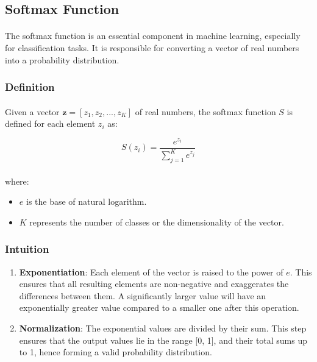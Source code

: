     \subsection{Softmax Function}\label{seq:background:softmax_function}

        \paragraph{}The softmax function is an essential component in machine learning, especially for classification tasks. It is responsible for converting a vector of real numbers into a probability distribution.

        \subsubsection{Definition}

            \paragraph{}Given a vector \( \mathbf{z} = [z_1, z_2, ..., z_K] \) of real numbers, the softmax function \( S \) is defined for each element \( z_i \) as:

            \begin{equation}
            S(z_i) = \frac{e^{z_i}}{\sum_{j=1}^{K} e^{z_j}}
            \end{equation}

            \paragraph{}where:
            \begin{itemize}
                \item \( e \) is the base of natural logarithm.
                \item \( K \) represents the number of classes or the dimensionality of the vector.
            \end{itemize}

        \subsubsection{Intuition}

            \begin{enumerate}
                \item \textbf{Exponentiation}: Each element of the vector is raised to the power of \( e \). This ensures that all resulting elements are non-negative and exaggerates the differences between them. A significantly larger value will have an exponentially greater value compared to a smaller one after this operation.
                
                \item \textbf{Normalization}: The exponential values are divided by their sum. This step ensures that the output values lie in the range [0, 1], and their total sums up to 1, hence forming a valid probability distribution.
            \end{enumerate}

